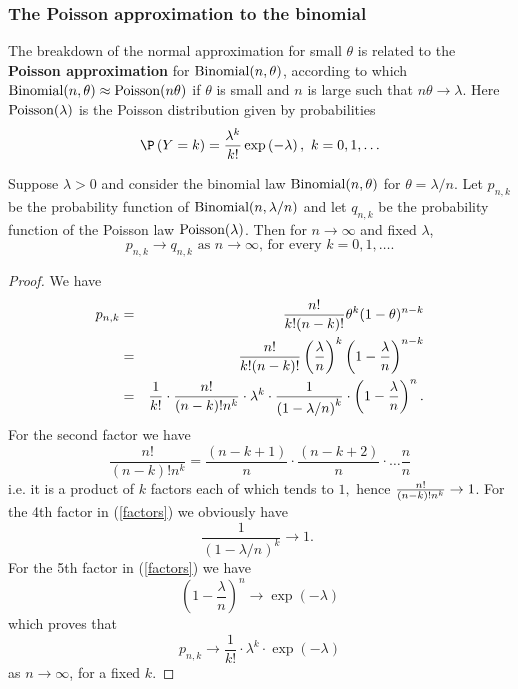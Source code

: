 \subsubsection{The Poisson approximation to the binomial}\label{S:PoissonApproxBinomialSuccessFailureRule}

The breakdown of the normal approximation for small $\theta$ is related to the 
\textbf{Poisson approximation} for $\mbox{{\rm Binomial}}(n,\theta)$, according to which $%
\binomial(n,\theta)\approx \poisson(n\theta)$ if $\theta$ is small and $n$ is large such that $%
n\theta\rightarrow \lambda $. Here $\mbox{{\rm Poisson}}(\lambda )$ is the Poisson
distribution given by probabilities 
\begin{equation*}
\P \left( Y=k\right) =\frac{\lambda ^{k}}{k!}\exp \left( -\lambda \right) ,%
\text{ }k=0,1,\ldots
\end{equation*}

\begin{prop}
Suppose $\lambda >0$ and consider the binomial law $\mbox{{\rm Binomial}}(n,\theta)$ for $\theta=\lambda
/n $. Let $p_{n,k}$ be the probability function of $\mbox{{\rm Binomial}}(n,\lambda /n)$ and let 
$q_{n,k}$ be the probability function of the Poisson law $\poisson%
(\lambda )$. Then for $n\rightarrow \infty $ and fixed $\lambda $,%
\begin{equation*}
p_{n,k}\rightarrow q_{n,k}\text{ as }n\rightarrow \infty \text{, for every }%
k=0,1,\ldots \text{.}
\end{equation*}
\end{prop}

\begin{proof}
We have 
\begin{eqnarray}
p_{n,k} &=&\frac{n!}{k!(n-k)!}\theta^{k}(1-\theta)^{n-k}  \notag \\
&=&\frac{n!}{k!(n-k)!}\left( \frac{\lambda }{n}\right) ^{k}\left( 1-\frac{%
\lambda }{n}\right) ^{n-k}  \notag \\
&=&\frac{1}{k!}\cdot \frac{n!}{(n-k)!n^{k}}\cdot \lambda ^{k}\cdot \frac{1}{%
\left( 1-\lambda /n\right) ^{k}}\cdot \left( 1-\frac{\lambda }{n}\right)
^{n}.  \label{factors}
\end{eqnarray}%
For the second factor we have 
\begin{equation*}
\frac{n!}{(n-k)!n^{k}}=\frac{\left( n-k+1\right) }{n}\cdot \frac{\left(
n-k+2\right) }{n}\cdot \ldots \frac{n}{n}
\end{equation*}%
i.e. it is a product of $k$ factors each of which tends to $1,$ hence $\frac{%
n!}{(n-k)!n^{k}}\rightarrow 1$. For the 4th factor in (\ref{factors}) we
obviously have 
\begin{equation*}
\frac{1}{\left( 1-\lambda /n\right) ^{k}}\rightarrow 1\text{. }
\end{equation*}%
For the 5th factor in (\ref{factors}) we have 
\begin{equation*}
\left( 1-\frac{\lambda }{n}\right) ^{n}\rightarrow \exp (-\lambda )
\end{equation*}%
which proves that 
\begin{equation*}
p_{n,k}\rightarrow \frac{1}{k!}\cdot \lambda ^{k}\cdot \exp (-\lambda )
\end{equation*}%
as $n\rightarrow \infty $, for a fixed $k.$
\end{proof}

